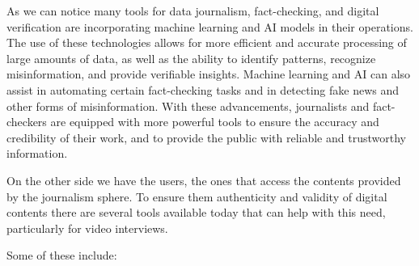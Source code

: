 \documentclass[target=mst,aauheader=]{thud}
\begin{document}
As we can notice many tools for data journalism, fact-checking, and digital verification are incorporating machine learning and AI models in their operations. The use of these technologies allows for more efficient and accurate processing of large amounts of data, as well as the ability to identify patterns, recognize misinformation, and provide verifiable insights. Machine learning and AI can also assist in automating certain fact-checking tasks and in detecting fake news and other forms of misinformation. With these advancements, journalists and fact-checkers are equipped with more powerful tools to ensure the accuracy and credibility of their work, and to provide the public with reliable and trustworthy information.

On the other side we have the users, the ones that access the contents provided by the journalism sphere. To ensure them authenticity and validity of digital contents there are several tools available today that can help with this need, particularly for video interviews.

Some of these include:
\end{document}
